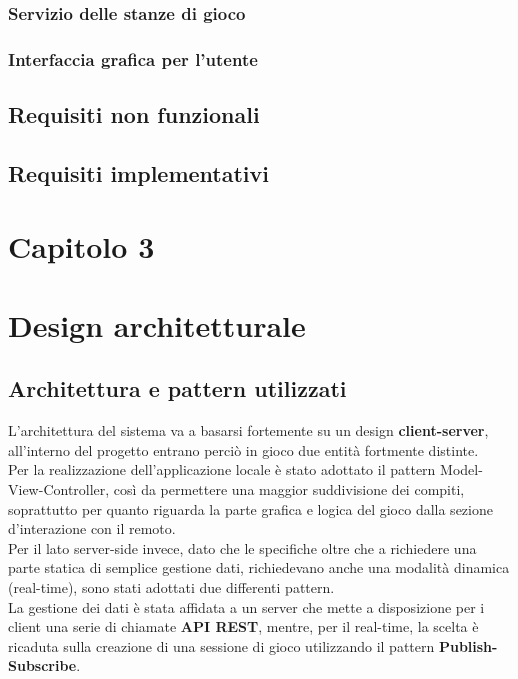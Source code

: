             \subsubsection[Stanze di gioco]{\large {Servizio delle stanze di gioco}\label{subsub:requirements:lobby}}
            \subsubsection[Interfaccia utente]{\large {Interfaccia grafica per l'utente}\label{subsub:requirements:gui}}
        \subsection {Requisiti non funzionali}\label{subsec:requirements:notFunctional}
        \subsection {Requisiti implementativi}\label{subsec:requirements:implementative}
   
   \clearpage
    \section*{\Huge {\textbf Capitolo 3}\label{chapter3}}
    \section{Design architetturale}\label{sec:design}
       
        
        \subsection[Architettura]{Architettura e pattern utilizzati}\label{subsec:architecture}
         L'architettura del sistema va a basarsi fortemente su un design \textbf{client-server}, all'interno del progetto entrano perciò in gioco due entità fortmente distinte. \\ Per la realizzazione dell'applicazione locale è stato adottato il pattern Model-View-Controller, così da permettere una maggior suddivisione dei compiti, soprattutto per quanto riguarda la parte grafica e logica del gioco dalla sezione d'interazione con il remoto.  \\
        Per il lato server-side invece, dato che le specifiche oltre che a richiedere una parte statica di semplice gestione dati, richiedevano anche una modalità dinamica (real-time), sono stati adottati due differenti pattern.
        \\
        La gestione dei dati è stata affidata a un server che mette a disposizione per i client una serie di chiamate \textbf{API REST}, mentre, per il real-time, la scelta è ricaduta sulla creazione di una sessione di gioco utilizzando il pattern \textbf{Publish-Subscribe}.
        
